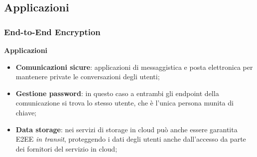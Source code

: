 \subsection{Applicazioni}
\begin{frame}
    \frametitle{End-to-End Encryption}
    \textbf{Applicazioni}\newline

    \begin{itemize}
        \item \textbf{Comunicazioni sicure}: applicazioni di messaggistica e posta elettronica per mantenere private le conversazioni degli utenti;
        \item \textbf{Gestione password}: in questo caso a entrambi gli endpoint della comunicazione si trova lo stesso utente, che è l'unica persona munita di chiave;
        \item \textbf{Data storage}: nei servizi di storage in cloud può anche essere garantita E2EE \textit{in transit}, proteggendo i dati degli utenti anche dall'accesso da parte dei fornitori del servizio in cloud;
    \end{itemize}

\end{frame}